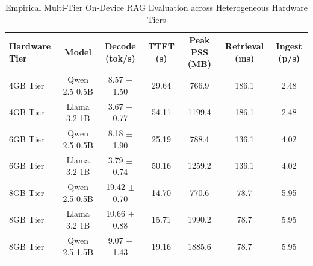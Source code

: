 \begin{table}[t]
\centering
\caption{Empirical Multi-Tier On-Device RAG Evaluation across Heterogeneous Hardware Tiers}
\label{tab:multitier_rag_results}
\begin{tabular}{lcccccc}
\hline
\textbf{Hardware Tier} & \textbf{Model} & \textbf{Decode (tok/s)} & \textbf{TTFT (s)} & \textbf{Peak PSS (MB)} & \textbf{Retrieval (ms)} & \textbf{Ingest (p/s)} \\ \hline
4GB Tier & Qwen 2.5 0.5B & 8.57 $\pm$ 1.50 & 29.64 & 766.9 & 186.1 & 2.48 \\
4GB Tier & Llama 3.2 1B & 3.67 $\pm$ 0.77 & 54.11 & 1199.4 & 186.1 & 2.48 \\
6GB Tier & Qwen 2.5 0.5B & 8.18 $\pm$ 1.90 & 25.19 & 788.4 & 136.1 & 4.02 \\
6GB Tier & Llama 3.2 1B & 3.79 $\pm$ 0.74 & 50.16 & 1259.2 & 136.1 & 4.02 \\
8GB Tier & Qwen 2.5 0.5B & 19.42 $\pm$ 0.70 & 14.70 & 770.6 & 78.7 & 5.95 \\
8GB Tier & Llama 3.2 1B & 10.66 $\pm$ 0.88 & 15.71 & 1990.2 & 78.7 & 5.95 \\
8GB Tier & Qwen 2.5 1.5B & 9.07 $\pm$ 1.43 & 19.16 & 1885.6 & 78.7 & 5.95 \\
\hline
\end{tabular}
\end{table}

